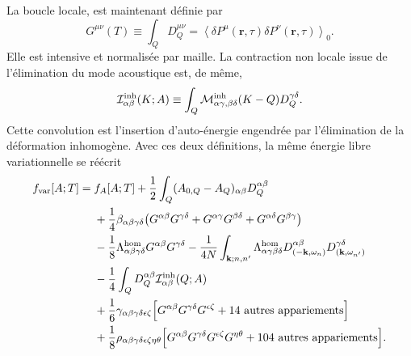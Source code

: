 La boucle locale, est maintenant définie par
\begin{equation}
G^{\mu\nu}(T)\equiv\int_QD_Q^{\mu\nu}
=\left\langle
\delta P^\mu(\mathbf r,\tau)\delta P^\nu(\mathbf r,\tau)
\right\rangle_0 .
\label{eq:core_equal_point_covariance}
\end{equation}
Elle est intensive et normalisée par maille. La contraction non locale issue
de l'élimination du mode acoustique est, de même,
\begin{equation}
\mathcal I^{\rm inh}_{\alpha\beta}(K;A)
\equiv\int_Q
\mathcal M^{\rm inh}_{\alpha\gamma,\beta\delta}(K-Q)
D_Q^{\gamma\delta}.
\label{eq:core_inhomogeneous_self_energy}
\end{equation}
Cette convolution est l'insertion d'auto-énergie engendrée par l'élimination
de la déformation inhomogène.
Avec ces deux définitions, la même énergie libre variationnelle se réécrit
\begin{equation}
\begin{aligned}
f_{\rm var}[A;T]={}&f_A[A;T]
+\frac12\int_Q(A_{0,Q}-A_Q)_{\alpha\beta}D_Q^{\alpha\beta}\\
&+\frac14\beta_{\alpha\beta\gamma\delta}
\big(G^{\alpha\beta}G^{\gamma\delta}
+G^{\alpha\gamma}G^{\beta\delta}
+G^{\alpha\delta}G^{\beta\gamma}\big)\\
&-\frac18\Lambda^{\rm hom}_{\alpha\beta\gamma\delta}
G^{\alpha\beta}G^{\gamma\delta}
-\frac{1}{4N}\int_{\mathbf k;n,n'}
\Lambda^{\rm hom}_{\alpha\gamma\beta\delta}
D_{(-\mathbf k,\omega_n)}^{\alpha\beta}
D_{(\mathbf k,\omega_{n'})}^{\gamma\delta}\\
&-\frac14\int_Q
D_Q^{\alpha\beta}\mathcal I^{\rm inh}_{\alpha\beta}(Q;A)\\
&+\frac16\gamma_{\alpha\beta\gamma\delta\epsilon\zeta}
\Big[G^{\alpha\beta}G^{\gamma\delta}G^{\epsilon\zeta}
+\text{14 autres appariements}\Big]\\
&+\frac18\rho_{\alpha\beta\gamma\delta\epsilon\zeta\eta\theta}
\Big[G^{\alpha\beta}G^{\gamma\delta}
G^{\epsilon\zeta}G^{\eta\theta}
+\text{104 autres appariements}\Big] .
\end{aligned}
\label{eq:core_variational_free_energy_compact}
\end{equation}

